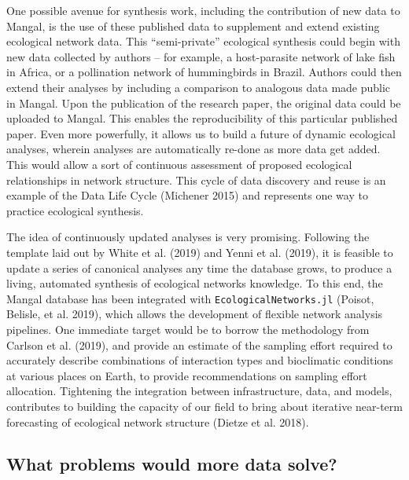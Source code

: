 \documentclass[11pt]{article}
\begin{document}
One possible avenue for synthesis work, including the contribution of
new data to Mangal, is the use of these published data to supplement and
extend existing ecological network data. This ``semi-private''
ecological synthesis could begin with new data collected by authors --
for example, a host-parasite network of lake fish in Africa, or a
pollination network of hummingbirds in Brazil. Authors could then extend
their analyses by including a comparison to analogous data made public
in Mangal. Upon the publication of the research paper, the original data
could be uploaded to Mangal. This enables the reproducibility of this
particular published paper. Even more powerfully, it allows us to build
a future of dynamic ecological analyses, wherein analyses are
automatically re-done as more data get added. This would allow a sort of
continuous assessment of proposed ecological relationships in network
structure. This cycle of data discovery and reuse is an example of the
Data Life Cycle (Michener 2015) and represents one way to practice
ecological synthesis.

The idea of continuously updated analyses is very promising. Following
the template laid out by White et al. (2019) and Yenni et al. (2019), it
is feasible to update a series of canonical analyses any time the
database grows, to produce a living, automated synthesis of ecological
networks knowledge. To this end, the Mangal database has been integrated
with \texttt{EcologicalNetworks.jl} (Poisot, Belisle, et al. 2019),
which allows the development of flexible network analysis pipelines. One
immediate target would be to borrow the methodology from Carlson et al.
(2019), and provide an estimate of the sampling effort required to
accurately describe combinations of interaction types and bioclimatic
conditions at various places on Earth, to provide recommendations on
sampling effort allocation. Tightening the integration between
infrastructure, data, and models, contributes to building the capacity
of our field to bring about iterative near-term forecasting of
ecological network structure (Dietze et al. 2018).

\hypertarget{what-problems-would-more-data-solve}{%
\subsection{What problems would more data
solve?}\label{what-problems-would-more-data-solve}}
\end{document}
